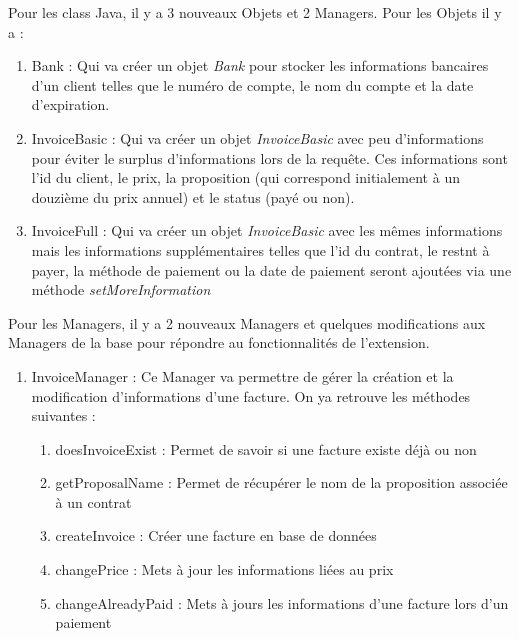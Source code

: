 \begin{flushleft}
    Pour les class Java, il y a 3 nouveaux Objets et 2 Managers. Pour les Objets il y a :
    \begin{enumerate}
        \item Bank :\newline
        Qui va créer un objet \textit{Bank} pour stocker les informations bancaires d'un client telles que le numéro de compte, le nom du compte et la date d'expiration.
        \item InvoiceBasic :\newline
        Qui va créer un objet \textit{InvoiceBasic} avec peu d'informations pour éviter le surplus d'informations lors de la requête. Ces informations sont l'id du client, le prix, la proposition (qui correspond initialement à un douzième du prix annuel) et le status (payé ou non).
        \item InvoiceFull :\newline
        Qui va créer un objet \textit{InvoiceBasic} avec les mêmes informations mais les informations supplémentaires telles que l'id du contrat, le restnt à payer, la méthode de paiement ou la date de paiement seront ajoutées via une méthode \textit{setMoreInformation}
    \end{enumerate}
    Pour les Managers, il y a 2 nouveaux Managers et quelques modifications aux Managers de la base pour répondre au fonctionnalités de l'extension.
    \begin{enumerate}
        \item InvoiceManager :\newline
        Ce Manager va permettre de gérer la création et la modification d'informations d'une facture. On ya retrouve les méthodes suivantes : 
        \begin{enumerate}
            \item doesInvoiceExist :\newline
            Permet de savoir si une facture existe déjà ou non
            \item getProposalName :\newline
            Permet de récupérer le nom de la proposition associée à un contrat
            \item createInvoice :\newline
            Créer une facture en base de données
            \item changePrice :\newline
            Mets à jour les informations liées au prix
            \item changeAlreadyPaid :\newline
            Mets à jours les informations d'une facture lors d'un paiement


\end{enumerate}
\end{enumerate}
\end{flushleft}
